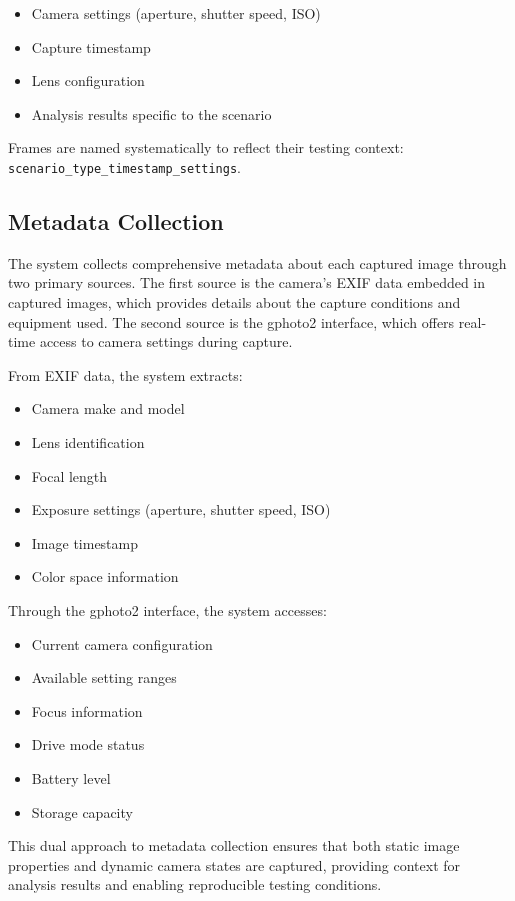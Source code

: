 \begin{itemize}
    \item Camera settings (aperture, shutter speed, ISO)
    \item Capture timestamp
    \item Lens configuration
    \item Analysis results specific to the scenario
\end{itemize}

Frames are named systematically to reflect their testing context: \texttt{scenario\_type\_timestamp\_settings}.

\subsection{Metadata Collection}

The system collects comprehensive metadata about each captured image through two primary sources. The first source is the camera's EXIF data embedded in captured images, which provides details about the capture conditions and equipment used. The second source is the gphoto2 interface, which offers real-time access to camera settings during capture.

From EXIF data, the system extracts:
\begin{itemize}
    \item Camera make and model
    \item Lens identification
    \item Focal length
    \item Exposure settings (aperture, shutter speed, ISO)
    \item Image timestamp
    \item Color space information
\end{itemize}

Through the gphoto2 interface, the system accesses:
\begin{itemize}
    \item Current camera configuration
    \item Available setting ranges
    \item Focus information
    \item Drive mode status
    \item Battery level
    \item Storage capacity
\end{itemize}

This dual approach to metadata collection ensures that both static image properties and dynamic camera states are captured, providing context for analysis results and enabling reproducible testing conditions.



